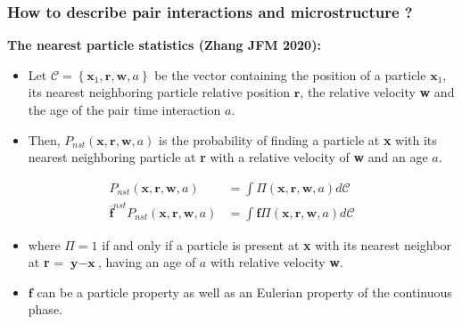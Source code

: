 \documentclass{sintefbeamer}
\newcommand{\nstavg}[1]{\overline{#1}^{nst}}
\newcommand{\CC}{\mathscr{C}}
\begin{document}
\begin{frame}
  \frametitle{How to describe pair interactions and microstructure ?}
  
  \textbf{The nearest particle statistics (Zhang JFM 2020): }
  \begin{definition}
    \begin{itemize}
      \item Let $\mathscr{C} =\left\{\textbf{x}_1, \textbf{r}, \textbf{w},a\right\}$ be the vector containing the position of a particle $\textbf{x}_1$, its nearest neighboring particle relative position $\textbf{r}$, the relative velocity \textbf{w} and the age of the pair time interaction $a$.
      \item Then, $P_{nst}(\textbf{x},\textbf{r},\textbf{w},a) $ is the probability of finding a particle at \textbf{x} with its nearest neighboring particle at \textbf{r} with a relative velocity of \textbf{w} and an age $a$. 
    \end{itemize}
  \end{definition}

  \begin{align*}
    P_{nst}(\textbf{x},\textbf{r},\textbf{w},a)
    &= \int \Pi(\textbf{x},\textbf{r},\textbf{w},a) d\CC\\
    \nstavg{\textbf{f}} P_{nst}(\textbf{x},\textbf{r},\textbf{w},a)
    &= \int \textbf{f} \Pi(\textbf{x},\textbf{r},\textbf{w},a) d\CC
  \end{align*}
  \begin{itemize}
    \item 
    where $\Pi = 1$ if and only if a particle is present at \textbf{x} with its nearest neighbor at \textbf{r} = $\textbf{y}-\textbf{x}$, having an age of $a$ with relative velocity \textbf{w}. 
    \item $\textbf{f}$ can be a particle property as well as an Eulerian property of the continuous phase. 
  \end{itemize}
\end{frame}
\end{document}
